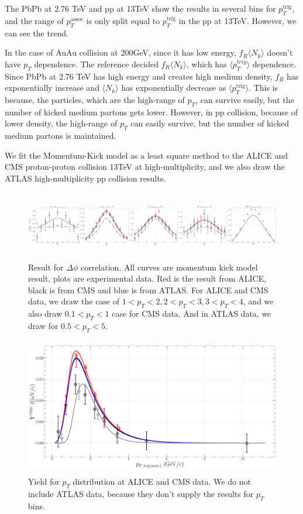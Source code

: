 \documentclass[jkps,fleqn,showpacs,showkeys]{revtex4}
\begin{document}
The PbPb at 2.76 TeV and pp at 13TeV show the results in several bins for $p_T^{\text{trig}}$, and the range of $p_T^{\text{assoc}}$ is only split equal to $p_T^{\text{trig}}$ in the pp at 13TeV. However, we can see the trend.


In the case of AuAu collision at 200GeV, since it has low energy, $f_R \langle N_k \rangle$ doesn't have $p_T$ dependence.
The reference\cite{PbPb} decided  $f_R \langle N_k \rangle$, which has $\langle p_T^{trig} \rangle$ dependence. Since PbPb at 2.76 TeV has high energy and creates high medium density, $f_R$ has exponentially increase and $\langle N_k \rangle$ has exponentially decrease as $\langle p_T^{\text{trig}} \rangle$. This is because, the particles, which are the high-range of $p_T$, can survive easily, but the number of kicked medium partons gets lower.
However, in pp collision, because of lower density, the high-range of $p_T$ can easily survive, but the number of kicked medium partons is maintained.

We fit the Momentum-Kick model as a least square method to the ALICE and CMS proton-proton collision 13TeV at high-multiplicity\cite{alice, cms}, and we also draw the ATLAS high-multiplicity pp collision results\cite{atlas}.

\begin{figure}[ht]
\centering
\includegraphics[width=18cm, height=3cm]{./Figures/Paper_phiCorr}
\caption{Result for $\Delta \phi$ correlation. All curves are momentum kick model result, plots are experimental data.
Red is the result from ALICE, black is from CMS and blue is from ATLAS.
For ALICE and CMS data, we draw the case of $1<p_T<2, 2<p_T<3, 3<p_T<4$, and we also draw $0.1<p_T<1$ case for CMS data. And in ATLAS data, we draw for $0.5<p_T<5$.}
\label{figure:phicorr}
\end{figure}

\begin{figure}[ht]
\centering
\includegraphics[width=12cm, height=6cm]{./Figures/Paper_pTdis}
\caption{Yield for $p_T$ distribution at ALICE and CMS data. We do not include ATLAS data, because they don't supply the results for $p_T$ bins.}
\label{figure:pTdis}
\end{figure}
\end{document}
